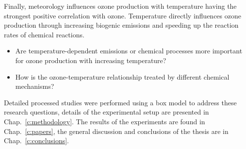 Finally, meteorology influences ozone production with temperature having the strongest positive correlation with ozone.
Temperature directly influences ozone production through increasing biogenic emissions and speeding up the reaction rates of chemical reactions.
\begin{itemize}
    \item Are temperature-dependent emissions or chemical processes more important for ozone production with increasing temperature? 
    \item How is the ozone-temperature relationship treated by different chemical mechanisms?
\end{itemize}

Detailed processed studies were performed using a box model to address these research questions, details of the experimental setup are presented in Chap.~\ref{c:methodology}.
The results of the experiments are found in Chap.~\ref{c:papers}, the general discussion and conclusions of the thesis are in Chap.~\ref{c:conclusions}.
